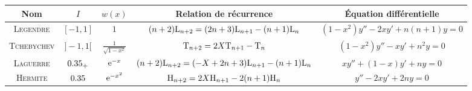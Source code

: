 \begin{figure*}[h!]
    \begingroup
    \renewcommand{\arraystretch}{1.2} %
    \begin{tabular}{|c|c|c|c|c|}
        \hline
        Nom & $I$ & $w(x)$ & Relation de récurrence & Équation différentielle\\
        \hline \hline
        \textsc{Legendre} & $[-1, 1]$ & $1$ & $(n+2) \mathrm{L}_{n+2} = (2n+3) \mathrm{L}_{n+1} - (n+1)\mathrm{L}_n$ & $(1-x^2) y'' - 2xy' + n(n+1) y = 0$\\
        \hline
        \textsc{Tchebychev} & $]-1, 1[$ & $\frac{1}{\sqrt{1-x^2}}$ & $\mathrm{T}_{n+2} = 2X \mathrm{T}_{n+1} - \mathrm{T}_n$ & $(1-x^2)y'' - xy' + n^2y = 0$ \\
        \hline
        \textsc{Laguerre} & $0.35_+$ & $\mathrm{e}^{-x}$ & $(n+2) \mathrm{L}_{n+2} = (-X+2n+3) \mathrm{L}_{n+1} - (n+1) \mathrm{L}_n$ & $xy'' + (1-x)y' + ny = 0$\\
        \hline
        \textsc{Hermite} & $0.35$ & $\mathrm{e}^{-x^2}$ & $\mathrm{H}_{n+2} = 2X \mathrm{H}_{n+1} - 2(n+1) \mathrm{H}_n$ & $y'' - 2xy' + 2ny = 0$\\
        \hline
    \end{tabular}
    \endgroup
\end{figure*}
